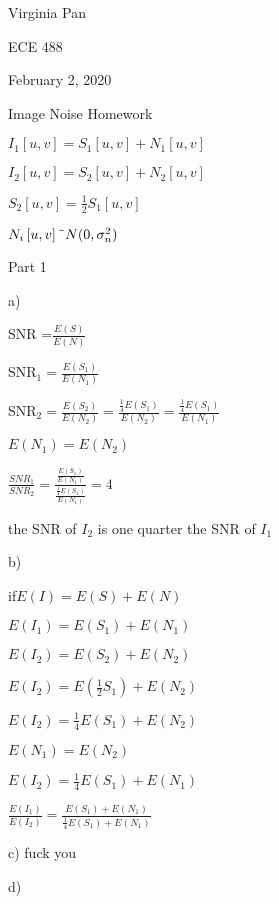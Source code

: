 \documentclass{article}
\begin{document}
Virginia Pan

ECE 488

February 2, 2020

Image Noise Homework

$I_{1}\left[ u,v\right] =S_{1}\left[ u,v\right] +N_{1}\left[ u,v\right] $

$I_{2}\left[ u,v\right] =S_{2}\left[ u,v\right] +N_{2}\left[ u,v\right] $

$S_{2}\left[ u,v\right] =\frac{1}{2}S_{1}\left[ u,v\right] $

$N_{i}\left[ u,v\right] \symbol{126}N(0,\sigma _{n}^{2})$

Part 1

a)

SNR =$\frac{E\left( S\right) }{E\left( N\right) }$

SNR$_{1}=\frac{E\left( S_{1}\right) }{E\left( N_{1}\right) }$

SNR$_{2}=\frac{E\left( S_{2}\right) }{E\left( N_{2}\right) }=\frac{\frac{1}{4%
}E\left( S_{1}\right) }{E\left( N_{2}\right) }=\frac{\frac{1}{4}E\left(
S_{1}\right) }{E\left( N_{1}\right) }$

\vspace{1pt}$E\left( N_{1}\right) =E\left( N_{2}\right) $

$\frac{SNR_{1}}{SNR_{2}}=\frac{\frac{E\left( S_{1}\right) }{E\left(
N_{1}\right) }}{\frac{\frac{1}{4}E\left( S_{1}\right) }{E\left( N_{1}\right) 
}}=\allowbreak 4$

\vspace{1pt}the SNR of $I_{2}$ is one quarter the SNR of $I_{1}$

b)

if$E\left( I\right) =E\left( S\right) +E\left( N\right) $

$E\left( I_{1}\right) =E\left( S_{1}\right) +E\left( N_{1}\right) $

$E\left( I_{2}\right) =E\left( S_{2}\right) +E\left( N_{2}\right) $

$E\left( I_{2}\right) =E\left( \frac{1}{2}S_{1}\right) +E\left( N_{2}\right) 
$

$E\left( I_{2}\right) =\frac{1}{4}E\left( S_{1}\right) +E\left( N_{2}\right) 
$

$E\left( N_{1}\right) =E\left( N_{2}\right) $

$E\left( I_{2}\right) =\frac{1}{4}E\left( S_{1}\right) +E\left( N_{1}\right) 
$

$\frac{E\left( I_{1}\right) }{E\left( I_{2}\right) }=\frac{E\left(
S_{1}\right) +E\left( N_{1}\right) }{\frac{1}{4}E\left( S_{1}\right)
+E\left( N_{1}\right) }$

c) fuck you

d)

\qquad
\end{document}
